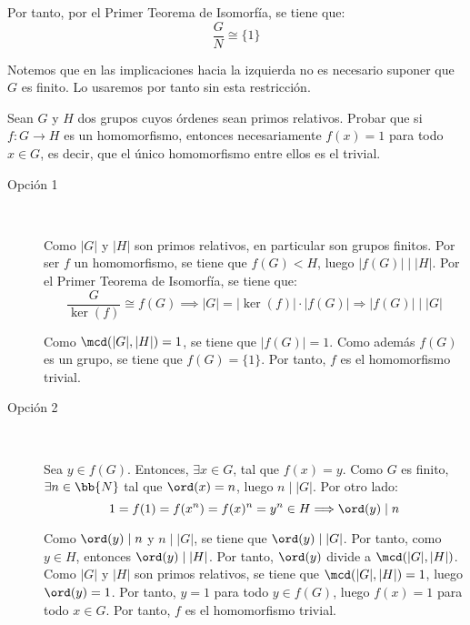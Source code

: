 \begin{ejercicio}
\begin{description}
        Por tanto, por el Primer Teorema de Isomorfía, se tiene que:
        \begin{equation*}
            \dfrac{G}{N}\cong \{1\}
        \end{equation*}
    \end{description}
    \begin{observacion}
        Notemos que en las implicaciones hacia la izquierda no es necesario suponer que $G$ es finito. Lo usaremos por tanto sin esta restricción.
    \end{observacion}
\end{ejercicio}

\begin{ejercicio}
    Sean $G$ y $H$ dos grupos cuyos órdenes sean primos relativos. Probar que si $f:G\to H$ es un homomorfismo, entonces necesariamente $f(x)=1$ para todo $x\in G$, es decir, que el único homomorfismo entre ellos es el trivial.
    \begin{description}
        \item[Opción 1]~
        
        Como $|G|$ y $|H|$ son primos relativos, en particular son grupos finitos.    Por ser $f$ un homomorfismo, se tiene que $f(G)<H$, luego $|f(G)|\mid |H|$. Por el Primer Teorema de Isomorfía, se tiene que:
    \begin{equation*}
        \dfrac{G}{\ker(f)}\cong f(G) \implies |G| = |\ker(f)|\cdot |f(G)|\Longrightarrow |f(G)|\mid |G|
    \end{equation*}

    Como $\mcd(|G|,|H|)=1$, se tiene que $|f(G)|=1$. Como además $f(G)$ es un grupo, se tiene que $f(G)=\{1\}$. Por tanto, $f$ es el homomorfismo trivial.

        \item[Opción 2]~
        
        Sea $y\in f(G)$. Entonces, $\exists x\in G$, tal que $f(x)=y$. Como $G$ es finito, $\exists n\in \bb{N}$ tal que $\ord(x)=n$, luego $n\mid |G|$. Por otro lado:
        \begin{equation*}
            1=f(1)=f(x^n)=f(x)^n=y^n\in H\Longrightarrow \ord(y)\mid n
        \end{equation*}

        Como $\ord(y)\mid n$ y $n\mid |G|$, se tiene que $\ord(y)\mid |G|$. Por tanto, como $y\in H$, entonces $\ord(y)\mid |H|$. Por tanto, $\ord(y)$ divide a $\mcd(|G|,|H|)$. Como $|G|$ y $|H|$ son primos relativos, se tiene que $\mcd(|G|,|H|)=1$, luego $\ord(y)=1$. Por tanto, $y=1$ para todo $y\in f(G)$, luego $f(x)=1$ para todo $x\in G$. Por tanto, $f$ es el homomorfismo trivial.
    \end{description}
\end{ejercicio}

